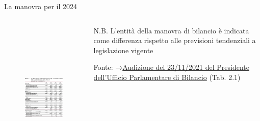 \documentclass[aspectratio=149,11pt,italian]{beamer}
\begin{document}
\begin{frame}{La manovra per il 2024}

  \begin{columns}
    \begin{column}{.75\columnwidth}
      \vspace{-3mm}
      \begin{figure}
        \centering
        \includegraphics[height=7.5cm]{./figure/audizione-UPB-DDL-bilancio-2024-tab-3-1.png}
      \end{figure}
    \end{column}

    \begin{column}{.25\columnwidth}
      \footnotesize N.B. L'entità della manovra di bilancio è indicata come
      differenza rispetto alle previsioni tendenziali \alert{a legislazione
        vigente}
      
      \vspace{5mm}

      \tiny Fonte: →\href{https://www.upbilancio.it/wp-content/uploads/2021/11/Audizione-UPB-DDL-bilancio-2022.pdf}{Audizione del 23/11/2021 del Presidente dell'Ufficio Parlamentare di Bilancio} (Tab. 2.1)
    \end{column}
  \end{columns}
\end{frame}
\end{document}
